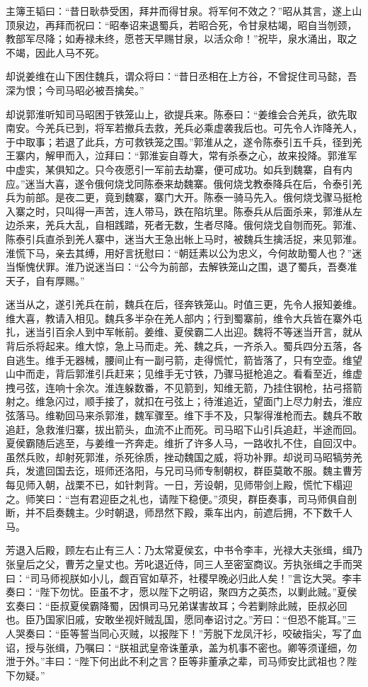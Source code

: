 主簿王韬曰：“昔日耿恭受困，拜井而得甘泉。将军何不效之？”昭从其言，遂上山顶泉边，再拜而祝曰：“昭奉诏来退蜀兵，若昭合死，令甘泉枯竭，昭自当刎颈，教部军尽降；如寿禄未终，愿苍天早赐甘泉，以活众命！”祝毕，泉水涌出，取之不竭，因此人马不死。

却说姜维在山下困住魏兵，谓众将曰：“昔日丞相在上方谷，不曾捉住司马懿，吾深为恨；今司马昭必被吾擒矣。”

却说郭淮听知司马昭困于铁笼山上，欲提兵来。陈泰曰：“姜维会合羌兵，欲先取南安。今羌兵已到，将军若撤兵去救，羌兵必乘虚袭我后也。可先令人诈降羌人，于中取事；若退了此兵，方可救铁笼之围。”郭淮从之，遂令陈泰引五千兵，径到羌王寨内，解甲而入，泣拜曰：“郭淮妄自尊大，常有杀泰之心，故来投降。郭淮军中虚实，某俱知之。只今夜愿引一军前去劫寨，便可成功。如兵到魏寨，自有内应。”迷当大喜，遂令俄何烧戈同陈泰来劫魏寨。俄何烧戈教泰降兵在后，令泰引羌兵为前部。是夜二更，竟到魏寨，寨门大开。陈泰一骑马先入。俄何烧戈骤马挺枪入寨之时，只叫得一声苦，连人带马，跌在陷坑里。陈泰兵从后面杀来，郭淮从左边杀来，羌兵大乱，自相践踏，死者无数，生者尽降。俄何烧戈自刎而死。郭淮、陈泰引兵直杀到羌人寨中，迷当大王急出帐上马时，被魏兵生擒活捉，来见郭淮。淮慌下马，亲去其缚，用好言抚慰曰：“朝廷素以公为忠义，今何故助蜀人也？”迷当惭愧伏罪。淮乃说迷当曰：“公今为前部，去解铁笼山之围，退了蜀兵，吾奏准天子，自有厚赐。”

迷当从之，遂引羌兵在前，魏兵在后，径奔铁笼山。时值三更，先令人报知姜维。维大喜，教请入相见。魏兵多半杂在羌人部内；行到蜀寨前，维令大兵皆在寨外屯扎，迷当引百余人到中军帐前。姜维、夏侯霸二人出迎。魏将不等迷当开言，就从背后杀将起来。维大惊，急上马而走。羌、魏之兵，一齐杀入。蜀兵四分五落，各自逃生。维手无器械，腰间止有一副弓箭，走得慌忙，箭皆落了，只有空壶。维望山中而走，背后郭淮引兵赶来；见维手无寸铁，乃骤马挺枪追之。看看至近，维虚拽弓弦，连响十余次。淮连躲数番，不见箭到，知维无箭，乃挂住钢枪，拈弓搭箭射之。维急闪过，顺手接了，就扣在弓弦上；待淮追近，望面门上尽力射去，淮应弦落马。维勒回马来杀郭淮，魏军骤至。维下手不及，只掣得淮枪而去。魏兵不敢追赶，急救淮归寨，拔出箭头，血流不止而死。司马昭下山引兵追赶，半途而回。夏侯霸随后逃至，与姜维一齐奔走。维折了许多人马，一路收扎不住，自回汉中。虽然兵败，却射死郭淮，杀死徐质，挫动魏国之威，将功补罪。却说司马昭犒劳羌兵，发遣回国去讫，班师还洛阳，与兄司马师专制朝权，群臣莫敢不服。魏主曹芳每见师入朝，战栗不已，如针刺背。一日，芳设朝，见师带剑上殿，慌忙下榻迎之。师笑曰：“岂有君迎臣之礼也，请陛下稳便。”须臾，群臣奏事，司马师俱自剖断，并不启奏魏主。少时朝退，师昂然下殿，乘车出内，前遮后拥，不下数千人马。

芳退入后殿，顾左右止有三人：乃太常夏侯玄，中书令李丰，光禄大夫张缉，缉乃张皇后之父，曹芳之皇丈也。芳叱退近侍，同三人至密室商议。芳执张缉之手而哭曰：“司马师视朕如小儿，觑百官如草芥，社稷早晚必归此人矣！”言讫大哭。李丰奏曰：“陛下勿忧。臣虽不才，愿以陛下之明诏，聚四方之英杰，以剿此贼。”夏侯玄奏曰：“臣叔夏侯霸降蜀，因惧司马兄弟谋害故耳；今若剿除此贼，臣叔必回也。臣乃国家旧戚，安敢坐视奸贼乱国，愿同奉诏讨之。”芳曰：“但恐不能耳。”三人哭奏曰：“臣等誓当同心灭贼，以报陛下！”芳脱下龙凤汗衫，咬破指尖，写了血诏，授与张缉，乃嘱曰：“朕祖武皇帝诛董承，盖为机事不密也。卿等须谨细，勿泄于外。”丰曰：“陛下何出此不利之言？臣等非董承之辈，司马师安比武祖也？陛下勿疑。”

